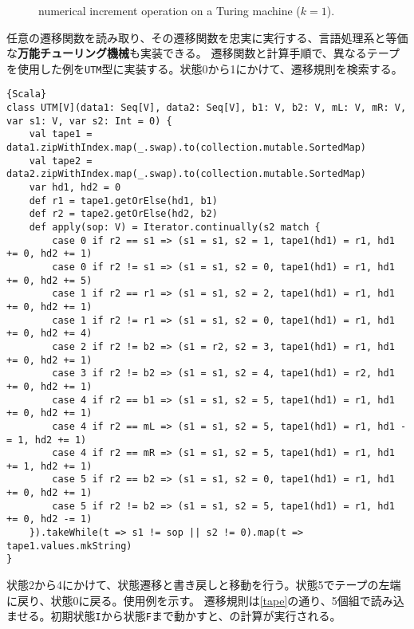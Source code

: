 \documentclass[10pt,a4paper]{book}
\begin{document}
\begin{figure}[h]
\centering
{}
\caption{numerical increment operation on a Turing machine ($k=1$).\label{fig:tape}}
\end{figure}

任意の遷移関数を読み取り、その遷移関数を忠実に実行する、言語処理系と等価な\textbf{万能チューリング機械}も実装できる。
遷移関数と計算手順で、異なるテープを使用した例を\texttt{UTM}型に実装する。状態0から1にかけて、遷移規則を検索する。

\begin{Verbatim}{Scala}
class UTM[V](data1: Seq[V], data2: Seq[V], b1: V, b2: V, mL: V, mR: V, var s1: V, var s2: Int = 0) {
	val tape1 = data1.zipWithIndex.map(_.swap).to(collection.mutable.SortedMap)
	val tape2 = data2.zipWithIndex.map(_.swap).to(collection.mutable.SortedMap)
	var hd1, hd2 = 0
	def r1 = tape1.getOrElse(hd1, b1) 
	def r2 = tape2.getOrElse(hd2, b2)
	def apply(sop: V) = Iterator.continually(s2 match {
		case 0 if r2 == s1 => (s1 = s1, s2 = 1, tape1(hd1) = r1, hd1 += 0, hd2 += 1) 
		case 0 if r2 != s1 => (s1 = s1, s2 = 0, tape1(hd1) = r1, hd1 += 0, hd2 += 5) 
		case 1 if r2 == r1 => (s1 = s1, s2 = 2, tape1(hd1) = r1, hd1 += 0, hd2 += 1) 
		case 1 if r2 != r1 => (s1 = s1, s2 = 0, tape1(hd1) = r1, hd1 += 0, hd2 += 4) 
		case 2 if r2 != b2 => (s1 = r2, s2 = 3, tape1(hd1) = r1, hd1 += 0, hd2 += 1) 
		case 3 if r2 != b2 => (s1 = s1, s2 = 4, tape1(hd1) = r2, hd1 += 0, hd2 += 1) 
		case 4 if r2 == b1 => (s1 = s1, s2 = 5, tape1(hd1) = r1, hd1 += 0, hd2 += 1) 
		case 4 if r2 == mL => (s1 = s1, s2 = 5, tape1(hd1) = r1, hd1 -= 1, hd2 += 1) 
		case 4 if r2 == mR => (s1 = s1, s2 = 5, tape1(hd1) = r1, hd1 += 1, hd2 += 1) 
		case 5 if r2 == b2 => (s1 = s1, s2 = 0, tape1(hd1) = r1, hd1 += 0, hd2 += 1) 
		case 5 if r2 != b2 => (s1 = s1, s2 = 5, tape1(hd1) = r1, hd1 += 0, hd2 -= 1) 
	}).takeWhile(t => s1 != sop || s2 != 0).map(t => tape1.values.mkString)
}
\end{Verbatim}

状態2から4にかけて、状態遷移と書き戻しと移動を行う。状態5でテープの左端に戻り、状態0に戻る。使用例を示す。
遷移規則は\eqref{tape}の通り、5個組で読み込ませる。初期状態\texttt{I}から状態\texttt{F}まで動かすと、の計算が実行される。
\end{document}
